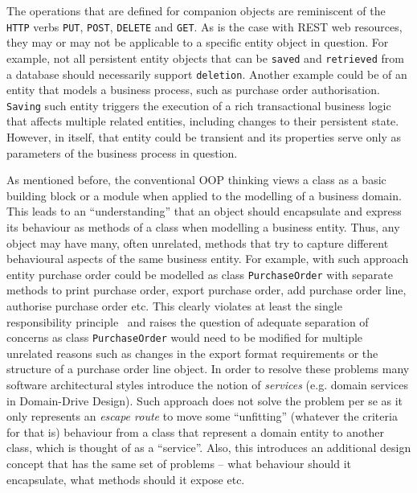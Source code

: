 \documentclass[a4paper,12pt,oneside,openright,final]{memoir} %
\begin{document}
	The operations that are defined for companion objects are reminiscent of the \texttt{HTTP} verbs \texttt{PUT}, \texttt{POST}, \texttt{DELETE} and \texttt{GET}.
	As is the case with REST web resources, they may or may not be applicable to a specific entity object in question.
	For example, not all persistent entity objects that can be \texttt{saved} and \texttt{retrieved} from a database should necessarily support \texttt{deletion}.
	Another example could be of an entity that models a business process, such as purchase order authorisation.
	\texttt{Saving} such entity triggers the execution of a rich transactional business logic that affects multiple related entities, including changes to their persistent state.
	However, in itself, that entity could be transient and its properties serve only as parameters of the business process in question.
	
	As mentioned before, the conventional OOP thinking views a class as a basic building block or a module when applied to the modelling of a business domain.
	This leads to an ``understanding'' that an object should encapsulate and express its behaviour as methods of a class when modelling a business entity. 
	Thus, any object may have many, often unrelated, methods that try to capture different behavioural aspects of the same business entity.
	For example, with such approach entity purchase order could be modelled as class \texttt{PurchaseOrder} with separate methods to print purchase order, export purchase order, add purchase order line, authorise purchase order etc.
	This clearly violates at least the single responsibility principle~\cite{SOLID} and raises the question of adequate separation of concerns as class \texttt{PurchaseOrder} would need to be modified for multiple unrelated reasons such as changes in the export format requirements or the structure of a purchase order line object.
	In order to resolve these problems many software architectural styles introduce the notion of \emph{services} (e.g. domain services in Domain-Drive Design).
	Such approach does not solve the problem per se as it only represents an \emph{escape route} to move some ``unfitting'' (whatever the criteria for that is) behaviour from a class that represent a domain entity to another class, which is thought of as a ``service''.
	Also, this introduces an additional design concept that has the same set of problems -- what behaviour should it encapsulate, what methods should it expose etc.
	
\end{document}
